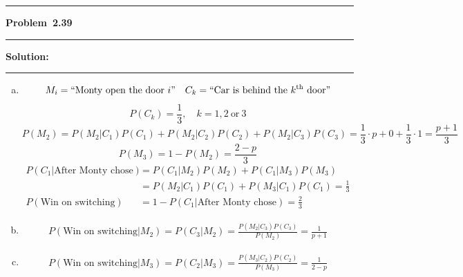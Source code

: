 \documentclass[10.5pt]{article}
\newcommand\question[1]{\vspace{.2in}\hrule\vspace{0.04in}\textbf{Problem\ #1}\vspace{.4em}\hrule\vspace{.10in}}
\newcommand\Solution{\vspace{.3in}\textbf{Solution:}\vspace{.5em}\hrule\vspace{.08in}\par}
\begin{document}
       
\vspace{2cm}

\pagebreak

\question{2.39}
	\Solution{}
	\begin{enumerate}[(a)]
		\item $$M_i = ``\text{Monty open the door}\ i"\quad C_k = ``\text{Car is behind the}\ k^{\text{th}}\ \text{door}"$$ $$P(C_k) = \frac{1}{3},\quad k = 1, 2\ \text{or}\ 3$$
		$$P(M_2) = P(M_2|C_1)P(C_1)+P(M_2|C_2)P(C_2)+P(M_2|C_3)P(C_3) =\frac{1}{3}\cdot p + 0 + \frac{1}{3}\cdot1= \frac{p+1}{3}$$
		$$P(M_3) = 1-P(M_2)= \frac{2-p}{3}$$
		\begin{align*}
			P(C_1|\text{After Monty chose}) 
			&= P(C_1|M_2)P(M_2)+P(C_1|M_3)P(M_3)\\[8pt]
			&= P(M_2|C_1)P(C_1)+P(M_3|C_1)P(C_1) = \frac{1}{3}\\[8pt]
			P(\text{Win on switching}) &= 1 - P(C_1|\text{After Monty chose}) = \frac{2}{3}
		\end{align*}\vspace{1cm}
		\item \begin{align*}
			P(\text{Win on switching}|M_2) = P(C_3|M_2) = \frac{P(M_2|C_3)P(C_3)}{P(M_2)} = \frac{1}{p+1}
		\end{align*}\vspace{1cm}
		\item \begin{align*}
			P(\text{Win on switching}|M_3) = P(C_2|M_3) = \frac{P(M_3|C_2)P(C_2)}{P(M_3)} = \frac{1}{2-p}
		\end{align*}
	\end{enumerate}

\pagebreak
\end{document}
